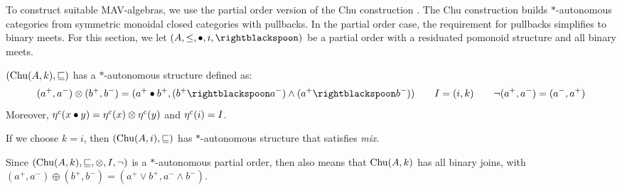 To construct suitable MAV-algebras, we use the partial order version
of the Chu construction \cite{barr}. The Chu construction builds
$*$-autonomous categories from symmetric monoidal closed categories
with pullbacks. In the partial order case, the requirement for
pullbacks simplifies to binary meets. For this section, we let
$(A, \leq, \bullet, i, \rightblackspoon)$ be a partial order with a
residuated pomonoid structure and all binary meets.


\begin{proposition}
  $(\mathrm{Chu}(A, k), \sqsubseteq)$ has a $*$-autonomous structure defined
  as:
  \begin{displaymath}
    (a^+, a^-) \otimes (b^+, b^-) = (a^+ \bullet b^+, (b^+ \rightblackspoon a^-) \land (a^+ \rightblackspoon b^-))
    \qquad
    I = (i, k)
    \qquad
    \lnot(a^+,a^-) = (a^-, a^+)
  \end{displaymath}
  Moreover,
  $\eta^c(x \bullet y) = \eta^c(x) \otimes \eta^c(y)$ and
  $\eta^c(i) = I$.
\end{proposition}

\begin{remark}
  If we choose $k = i$, then $(\mathrm{Chu}(A, i), \sqsubseteq)$ has
  $*$-autonomous structure that satisfies \emph{mix}.
\end{remark}


\begin{remark}
  Since $(\mathrm{Chu}(A, k), \sqsubseteq, \otimes, I, \lnot)$ is a
  $*$-autonomous partial order, then 
  also means that $\mathrm{Chu}(A, k)$ has all binary joins, with
  $(a^+, a^-) \oplus (b^+, b^-) = (a^+ \lor b^+, a^- \land b^-)$.
\end{remark}

